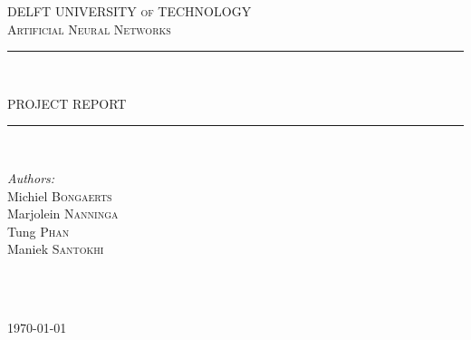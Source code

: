 \documentclass[a4paper,onecolumn]{report}
\begin{document}

\begin{titlepage}

\newcommand{\HRule}{\rule{\linewidth}{0.5mm}}
\newcommand{\horrule}[1]{\rule{\linewidth}{#1}}

\center %

\textsc{\small DELFT UNIVERSITY of TECHNOLOGY}\\[2.5cm] %

\textsc{\LARGE Artificial Neural Networks}\\[0.5cm] %

\HRule \\[0.1cm]
\begin{spacing}{1.6}
{ \huge PROJECT REPORT}\\[-0.4cm] %
\end{spacing}
\HRule \\[1.5cm]

\begin{minipage}{0.4\textwidth}
\begin{flushleft} \large
\emph{Authors:}\\
Michiel \textsc{Bongaerts\\}
Marjolein \textsc{Nanninga}\\
Tung \textsc{Phan}\\
Maniek \textsc{Santokhi}
\end{flushleft}
\end{minipage}
~
\begin{minipage}{0.4\textwidth}
\begin{flushright} \large
\end{flushright}
\end{minipage}\\[4cm]

{\large \today}\\[3cm]


\vfill

\end{titlepage}

\end{document}
